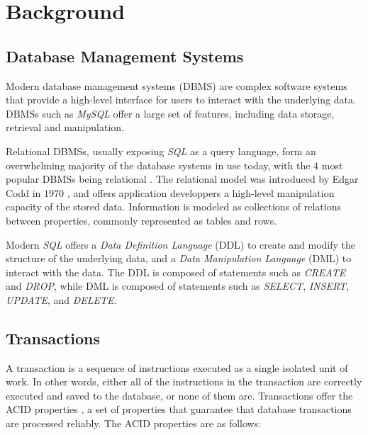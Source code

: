 \chapter{Background}

 
\section{Database Management Systems}

Modern database management systems (DBMS) are complex software systems that provide a high-level interface for users to interact with the underlying data. DBMSs such as \textit{MySQL} \cite{mysqlwebpage} offer a large set of features, including data storage, retrieval and manipulation.

Relational DBMSs, usually exposing \textit{SQL} as a query language, form an overwhelming majority of the database systems in use today, with the 4 most popular DBMSs being relational \cite{akhtar2023popularity}. The relational model was introduced by Edgar Codd in $1970$ \cite{codd1970relational}, and offers application developpers a high-level manipulation capacity of the stored data. Information is modeled as collections of relations between properties, commonly represented as tables and rows.

Modern \textit{SQL} offers a \textit{Data Definition Language} (DDL) to create and modify the structure of the underlying data, and a \textit{Data Manipulation Language} (DML) to interact with the data. The DDL is composed of statements such as \textit{CREATE} and \textit{DROP}, while DML is composed of statements such as \textit{SELECT}, \textit{INSERT}, \textit{UPDATE}, and \textit{DELETE}.

\section{Transactions}

A transaction is a sequence of instructions executed as a single isolated unit of work. In other words, either all of the instructions in the transaction are correctly executed and saved to the database, or none of them are. Transactions offer the ACID properties \cite{gray1981transaction}, a set of properties that guarantee that database transactions are processed reliably. The ACID properties are as follows:

